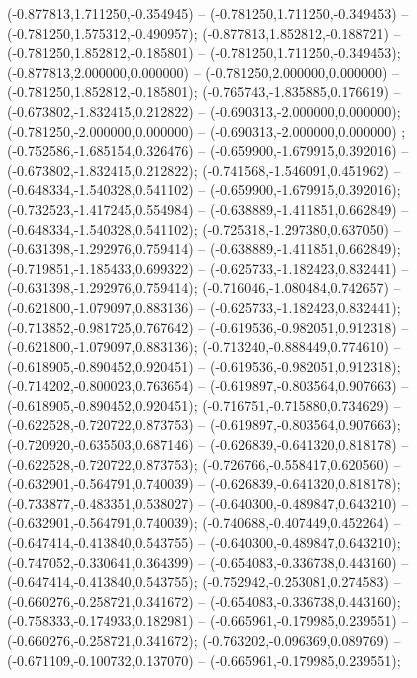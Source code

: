  (-0.877813,1.711250,-0.354945) -- (-0.781250,1.711250,-0.349453) -- (-0.781250,1.575312,-0.490957);
 (-0.877813,1.852812,-0.188721) -- (-0.781250,1.852812,-0.185801) -- (-0.781250,1.711250,-0.349453);
 (-0.877813,2.000000,0.000000) -- (-0.781250,2.000000,0.000000) -- (-0.781250,1.852812,-0.185801);
 (-0.765743,-1.835885,0.176619) -- (-0.673802,-1.832415,0.212822) -- (-0.690313,-2.000000,0.000000);
 (-0.781250,-2.000000,0.000000) -- (-0.690313,-2.000000,0.000000) ;
 (-0.752586,-1.685154,0.326476) -- (-0.659900,-1.679915,0.392016) -- (-0.673802,-1.832415,0.212822);
 (-0.741568,-1.546091,0.451962) -- (-0.648334,-1.540328,0.541102) -- (-0.659900,-1.679915,0.392016);
 (-0.732523,-1.417245,0.554984) -- (-0.638889,-1.411851,0.662849) -- (-0.648334,-1.540328,0.541102);
 (-0.725318,-1.297380,0.637050) -- (-0.631398,-1.292976,0.759414) -- (-0.638889,-1.411851,0.662849);
 (-0.719851,-1.185433,0.699322) -- (-0.625733,-1.182423,0.832441) -- (-0.631398,-1.292976,0.759414);
 (-0.716046,-1.080484,0.742657) -- (-0.621800,-1.079097,0.883136) -- (-0.625733,-1.182423,0.832441);
 (-0.713852,-0.981725,0.767642) -- (-0.619536,-0.982051,0.912318) -- (-0.621800,-1.079097,0.883136);
 (-0.713240,-0.888449,0.774610) -- (-0.618905,-0.890452,0.920451) -- (-0.619536,-0.982051,0.912318);
 (-0.714202,-0.800023,0.763654) -- (-0.619897,-0.803564,0.907663) -- (-0.618905,-0.890452,0.920451);
 (-0.716751,-0.715880,0.734629) -- (-0.622528,-0.720722,0.873753) -- (-0.619897,-0.803564,0.907663);
 (-0.720920,-0.635503,0.687146) -- (-0.626839,-0.641320,0.818178) -- (-0.622528,-0.720722,0.873753);
 (-0.726766,-0.558417,0.620560) -- (-0.632901,-0.564791,0.740039) -- (-0.626839,-0.641320,0.818178);
 (-0.733877,-0.483351,0.538027) -- (-0.640300,-0.489847,0.643210) -- (-0.632901,-0.564791,0.740039);
 (-0.740688,-0.407449,0.452264) -- (-0.647414,-0.413840,0.543755) -- (-0.640300,-0.489847,0.643210);
 (-0.747052,-0.330641,0.364399) -- (-0.654083,-0.336738,0.443160) -- (-0.647414,-0.413840,0.543755);
 (-0.752942,-0.253081,0.274583) -- (-0.660276,-0.258721,0.341672) -- (-0.654083,-0.336738,0.443160);
 (-0.758333,-0.174933,0.182981) -- (-0.665961,-0.179985,0.239551) -- (-0.660276,-0.258721,0.341672);
 (-0.763202,-0.096369,0.089769) -- (-0.671109,-0.100732,0.137070) -- (-0.665961,-0.179985,0.239551);
